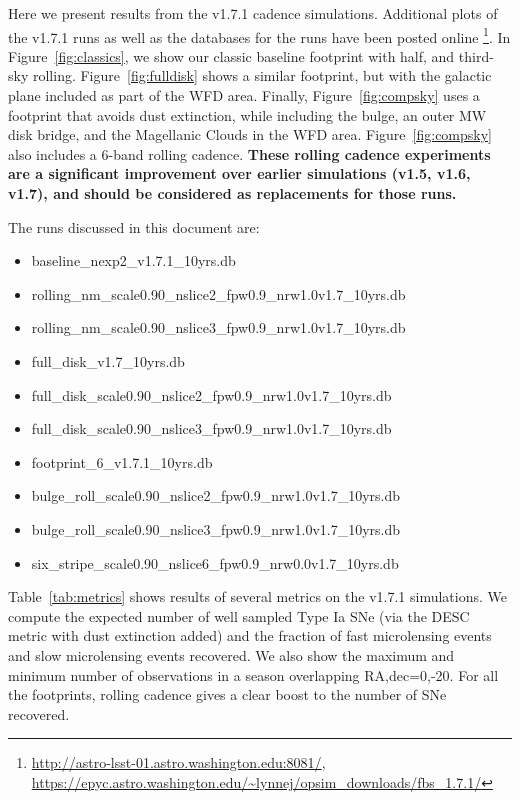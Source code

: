 \documentclass[modern]{aastex62}
\begin{document}
Here we present results from the v1.7.1 cadence simulations. Additional plots of the v1.7.1 runs as well as the databases for the runs have been posted online \footnote{\url{http://astro-lsst-01.astro.washington.edu:8081/}, \url{https://epyc.astro.washington.edu/~lynnej/opsim_downloads/fbs_1.7.1/}}.  In Figure~\ref{fig:classics}, we show our classic baseline footprint with half, and third-sky rolling. Figure~\ref{fig:fulldisk} shows a similar footprint, but with the galactic plane included as part of the WFD area. Finally, Figure~\ref{fig:compsky} uses a footprint that avoids dust extinction, while including the bulge, an outer MW disk bridge, and the Magellanic Clouds in the WFD area. Figure~\ref{fig:compsky} also includes a 6-band rolling cadence.  {\bf{These rolling cadence experiments are a significant improvement over earlier simulations (v1.5, v1.6, v1.7), and should be considered as replacements for those runs.}}

The runs discussed in this document are:
\begin{itemize}
    \item{{baseline\_nexp2\_v1.7.1\_10yrs.db}}
    \item{{rolling\_nm\_scale0.90\_nslice2\_fpw0.9\_nrw1.0v1.7\_10yrs.db}}
    \item{{rolling\_nm\_scale0.90\_nslice3\_fpw0.9\_nrw1.0v1.7\_10yrs.db}}
    \item{{full\_disk\_v1.7\_10yrs.db}}
    \item{{full\_disk\_scale0.90\_nslice2\_fpw0.9\_nrw1.0v1.7\_10yrs.db}}
    \item{{full\_disk\_scale0.90\_nslice3\_fpw0.9\_nrw1.0v1.7\_10yrs.db}}
    \item{{footprint\_6\_v1.7.1\_10yrs.db}}
    \item{{bulge\_roll\_scale0.90\_nslice2\_fpw0.9\_nrw1.0v1.7\_10yrs.db}}
    \item{{bulge\_roll\_scale0.90\_nslice3\_fpw0.9\_nrw1.0v1.7\_10yrs.db}}
    \item{{six\_stripe\_scale0.90\_nslice6\_fpw0.9\_nrw0.0v1.7\_10yrs.db}}
\end{itemize}

Table~\ref{tab:metrics} shows results of several metrics on the v1.7.1 simulations. We compute the expected number of well sampled Type Ia SNe (via the DESC metric with dust extinction added) and the fraction of fast microlensing events and slow microlensing events recovered. We also show the maximum and minimum number of observations in a season overlapping RA,dec=0,-20. For all the footprints, rolling cadence gives a clear boost to the number of SNe recovered.  
\end{document}
